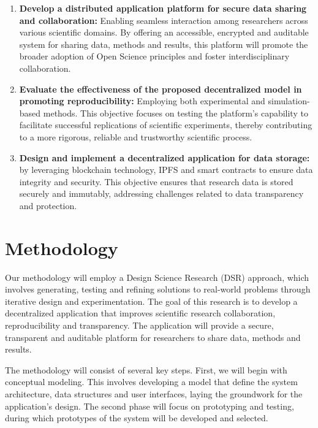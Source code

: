 \documentclass[final]{rc-book-2.14}
\begin{document}
\begin{enumerate}
    \item \textbf{Develop a distributed application platform for secure data sharing and collaboration:} Enabling seamless interaction among researchers across various scientific domains. By offering an accessible, encrypted and auditable system for sharing data, methods and results, this platform will promote the broader adoption of Open Science principles and foster interdisciplinary collaboration.

    \item \textbf{Evaluate the effectiveness of the proposed decentralized model in promoting reproducibility:} Employing both experimental and simulation-based methods. This objective focuses on testing the platform's capability to facilitate successful replications of scientific experiments, thereby contributing to a more rigorous, reliable and trustworthy scientific process.

    \item \textbf{Design and implement a decentralized application for data storage:} by leveraging blockchain technology, IPFS and smart contracts to ensure data integrity and security. This objective ensures that research data is stored securely and immutably, addressing challenges related to data transparency and protection.
\end{enumerate}


\section{Methodology}
\label{sec:introduction:methodology}

Our methodology will employ a Design Science Research (DSR) \cite{hevner2004design}approach, which involves generating, testing and refining solutions to real-world problems through iterative design and experimentation. The goal of this research is to develop a decentralized application that improves scientific research collaboration, reproducibility and transparency. The application will provide a secure, transparent and auditable platform for researchers to share data, methods and results.

The methodology will consist of several key steps. First, we will begin with conceptual modeling. This involves developing a model that define the system architecture, data structures and user interfaces, laying the groundwork for the application’s design. The second phase will focus on prototyping and testing, during which prototypes of the system will be developed and selected.
\end{document}
